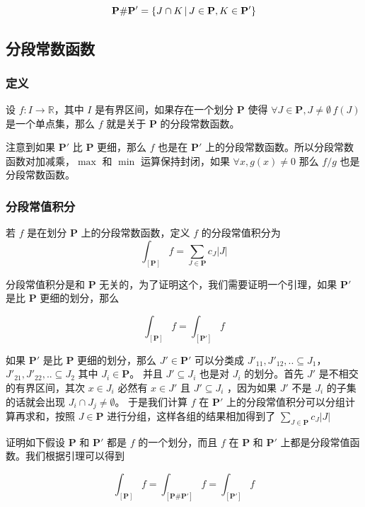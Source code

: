 \[
    \mathbf{P} \# \mathbf{P'} = \{ J \cap K \,\vert\, J \in \mathbf{P}, K \in \mathbf{P'}\}
\]

\subsection{分段常数函数}

\subsubsection{定义}
设 $f: I \to \mathbb{R}$，其中 $I$ 是有界区间，如果存在一个划分 $\mathbf{P}$ 使得 $\forall J \in \mathbf{P}, J \ne \emptyset \, f(J)$ 是一个单点集，那么 $f$ 就是关于 $\mathbf{P}$ 的分段常数函数。

注意到如果 $\mathbf{P'}$ 比 $\mathbf{P}$ 更细，那么 $f$ 也是在 $\mathbf{P'}$ 上的分段常数函数。所以分段常数函数对加减乘，$\max$ 和 $\min$ 运算保持封闭，如果 $\forall x, g(x) \ne 0$ 那么 $f/g$ 也是分段常数函数。

\subsubsection{分段常值积分}

若 $f$ 是在划分 $\mathbf{P}$ 上的分段常数函数，定义 $f$ 的分段常值积分为 
\[
    \int_{[\mathbf{P}]} f = \sum_{J \in \mathbf{P}}c_J \lvert J \rvert
\]

分段常值积分是和 $\mathbf{P}$ 无关的，为了证明这个，我们需要证明一个引理，如果 $\mathbf{P'}$ 是比 $\mathbf{P}$ 更细的划分，那么

\[
    \int_{[\mathbf{P}]} f =\int_{[\mathbf{P'}]} f
\]

如果 $\mathbf{P'}$ 是比 $\mathbf{P}$ 更细的划分，那么 $J' \in \mathbf{P'}$ 可以分类成 $J'_{11}, J'_{12}, .. \subseteq J_1$， $J'_{21}, J'_{22}, .. \subseteq J_2$ 其中 $J_i \in \mathbf{P}$。
并且 $J' \subseteq J_i$ 也是对 $J_i$ 的划分。首先 $J'$ 是不相交的有界区间，其次 $x \in J_i$ 必然有 $x \in J'$ 且 $J' \subseteq J_i$ ，因为如果 $J'$ 不是 $J_i$ 的子集的话就会出现 $J_i \cap J_j \ne \emptyset$。
于是我们计算 $f$ 在 $\mathbf{P'}$ 上的分段常值积分可以分组计算再求和，按照 $J \in \mathbf{P}$ 进行分组，这样各组的结果相加得到了 $\sum_{J \in \mathbf{P}}c_J \lvert J \rvert$

证明如下假设 $\mathbf{P}$ 和 $\mathbf{P'}$ 都是 $f$ 的一个划分，而且 $f$ 在 $\mathbf{P}$ 和 $\mathbf{P'}$ 上都是分段常值函数。我们根据引理可以得到  

\[
    \int_{[\mathbf{P}]} f =\int_{[\mathbf{P \# P'}]} f = \int_{[\mathbf{P'}]} f
\]

